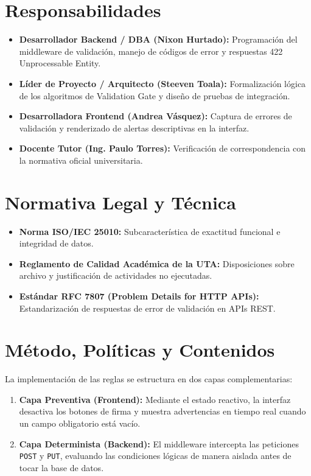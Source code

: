 \documentclass[12pt,a4paper]{article}
\begin{document}
\section{Responsabilidades}
\begin{itemize}[leftmargin=1.5em, itemsep=2pt]
    \item \textbf{Desarrollador Backend / DBA (Nixon Hurtado):} Programación del middleware de validación, manejo de códigos de error y respuestas 422 Unprocessable Entity.
    \item \textbf{Líder de Proyecto / Arquitecto (Steeven Toala):} Formalización lógica de los algoritmos de Validation Gate y diseño de pruebas de integración.
    \item \textbf{Desarrolladora Frontend (Andrea Vásquez):} Captura de errores de validación y renderizado de alertas descriptivas en la interfaz.
    \item \textbf{Docente Tutor (Ing. Paulo Torres):} Verificación de correspondencia con la normativa oficial universitaria.
\end{itemize}

\section{Normativa Legal y Técnica}
\begin{itemize}[leftmargin=1.5em, itemsep=1.5pt]
    \item \textbf{Norma ISO/IEC 25010:} Subcaracterística de exactitud funcional e integridad de datos.
    \item \textbf{Reglamento de Calidad Académica de la UTA:} Disposiciones sobre archivo y justificación de actividades no ejecutadas.
    \item \textbf{Estándar RFC 7807 (Problem Details for HTTP APIs):} Estandarización de respuestas de error de validación en APIs REST.
\end{itemize}

\section{Método, Políticas y Contenidos}
La implementación de las reglas se estructura en dos capas complementarias:
\begin{enumerate}[leftmargin=1.5em, itemsep=2pt]
    \item \textbf{Capa Preventiva (Frontend):} Mediante el estado reactivo, la interfaz desactiva los botones de firma y muestra advertencias en tiempo real cuando un campo obligatorio está vacío.
    \item \textbf{Capa Determinista (Backend):} El middleware intercepta las peticiones \texttt{POST} y \texttt{PUT}, evaluando las condiciones lógicas de manera aislada antes de tocar la base de datos.
\end{enumerate}
\end{document}
